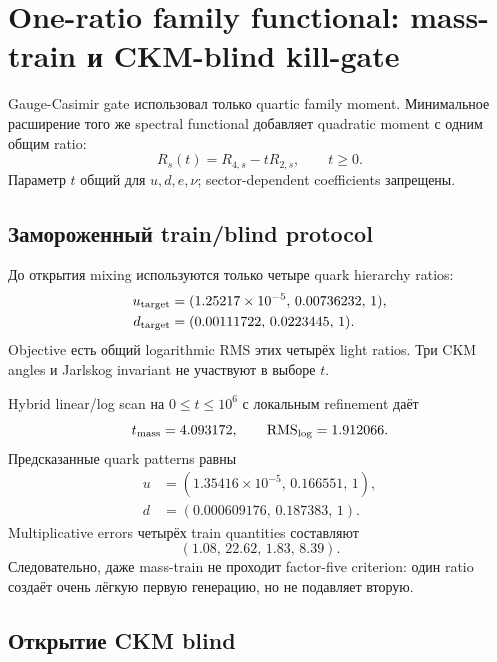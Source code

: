 \chapter{One-ratio family functional: mass-train и CKM-blind kill-gate}

Gauge-Casimir gate использовал только quartic family moment. Минимальное
расширение того же spectral functional добавляет quadratic moment с одним
общим ratio:
\begin{equation}
 R_s(t)=R_{4,s}-tR_{2,s},
 \qquad t\ge0.
\end{equation}
Параметр \(t\) общий для \(u,d,e,\nu\); sector-dependent coefficients
запрещены.

\section{Замороженный train/blind protocol}

До открытия mixing используются только четыре quark hierarchy ratios:
\begin{align}
 u_{\rm target}&=(1.25217\times10^{-5},\,0.00736232,\,1),\\
 d_{\rm target}&=(0.00111722,\,0.0223445,\,1).
\end{align}
Objective есть общий logarithmic RMS этих четырёх light ratios. Три CKM
angles и Jarlskog invariant не участвуют в выборе \(t\).

Hybrid linear/log scan на \(0\le t\le10^6\) с локальным refinement даёт
\begin{equation}
 t_{\rm mass}=4.093172,
 \qquad
 \operatorname{RMS}_{\log}=1.912066.
\end{equation}
Предсказанные quark patterns равны
\begin{align}
 u&=(1.35416\times10^{-5},\,0.166551,\,1),\\
 d&=(0.000609176,\,0.187383,\,1).
\end{align}
Multiplicative errors четырёх train quantities составляют
\begin{equation}
 (1.08,\,22.62,\,1.83,\,8.39).
\end{equation}
Следовательно, даже mass-train не проходит factor-five criterion: один ratio
создаёт очень лёгкую первую генерацию, но не подавляет вторую.

\section{Открытие CKM blind}

